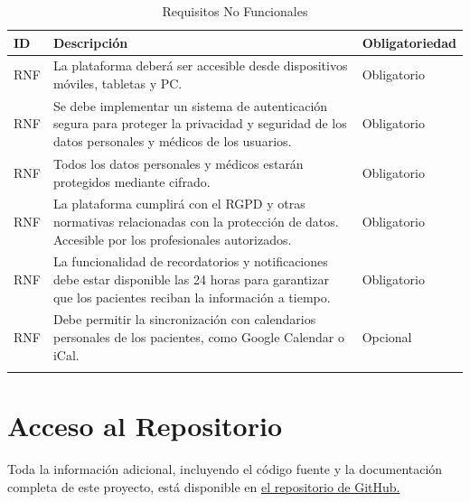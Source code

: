 \documentclass{article}
\begin{document}
\begin{table}[H]
	\centering
	\caption{Requisitos No Funcionales}
	\begin{tabular}{@{} p{2.5cm} p{6.5cm} p{3cm} @{}}
		\toprule
		\textbf{ID} & \textbf{Descripción} & \textbf{Obligatoriedad} \\
		\midrule
		\addlinespace
		\stepcounter{requisitosNoFuncionales} RNF\therequisitosNoFuncionales & La plataforma deberá ser accesible desde dispositivos móviles, tabletas y PC. & Obligatorio \\
		\addlinespace
		\stepcounter{requisitosNoFuncionales} RNF\therequisitosNoFuncionales & Se debe implementar un sistema de autenticación segura para proteger la privacidad y seguridad de los datos personales y médicos de los usuarios. & Obligatorio\\
			\stepcounter{requisitosNoFuncionales} RNF\therequisitosNoFuncionales & Todos los datos personales y médicos estarán protegidos mediante cifrado. & Obligatorio \\
		\addlinespace
		\stepcounter{requisitosNoFuncionales} RNF\therequisitosNoFuncionales &La plataforma cumplirá con el RGPD y otras normativas relacionadas con la protección de datos. Accesible por los profesionales autorizados. & Obligatorio \\
		\addlinespace
		\stepcounter{requisitosNoFuncionales}
		RNF\therequisitosNoFuncionales & La funcionalidad de recordatorios y notificaciones debe estar disponible las 24 horas para garantizar que los pacientes reciban la información a tiempo. & Obligatorio \\
		\addlinespace
		\stepcounter{requisitosNoFuncionales}
		RNF\therequisitosNoFuncionales &  Debe permitir la sincronización con calendarios personales de los pacientes, como Google Calendar o iCal. & Opcional \\
		\addlinespace
		\bottomrule
	\end{tabular}
\end{table}
	
	\section{Acceso al Repositorio}
	
	Toda la información adicional, incluyendo el código fuente y la documentación completa de este proyecto, está disponible en  \href{https://github.com/Organizacion-basada-en-componentes/ingenieria_web}{el repositorio de GitHub.} 
	
	
\end{document}
